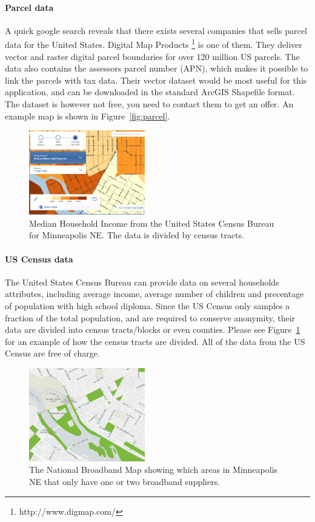 \documentclass[twocolumn]{article}
\begin{document}
\paragraph{Parcel data}

\label{par:Parcel data}
A quick google search reveals that there exists several companies that sells parcel data for the United States. Digital Map Products \footnote{http://www.digmap.com/} is one of them. They deliver vector and raster digital parcel boundaries for over 120 million US parcels. The data also contains the assessors parcel number (APN), which makes it possible to link the parcels with tax data. Their vector dataset would be most useful for this application, and can be downloaded in the standard ArcGIS Shapefile format. The dataset is however not free, you need to contact them to get an offer. An example map is shown in Figure~\ref{fig:parcel}.

\begin{figure}
  \centering
  \includegraphics[width=0.45\textwidth]{img/census.png}
  \caption{Median Household Income from the United States Census Bureau for Minneapolis NE. The data is divided by census tracts.}
  \label{fig:census}
\end{figure}
\paragraph{US Census data}
\label{par:Us Census data}
The United States Census Bureau can provide data on several households attributes, including average income, average number of children and precentage of population with high school diploma. Since the US Census only samples a fraction of the total population, and are required to conserve anonymity, their data are divided into census tracts/blocks or even counties. Please see Figure~\ref{fig:census} for an example of how the census tracts are divided. All of the data from the US Census are free of charge.

\begin{figure}
  \centering
  \includegraphics[width=0.45\textwidth]{img/nbm.png}
  \caption{The National Broadband Map showing which areas in Minneapolis NE that only have one or two broadband suppliers.}
  \label{fig:nbm}
\end{figure}
\end{document}
